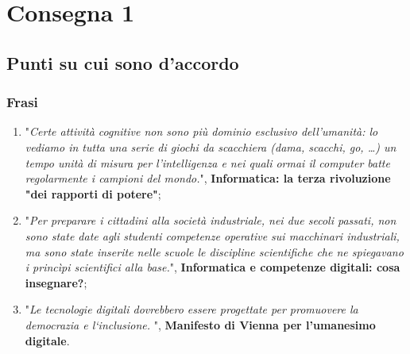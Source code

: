 \chapter{Consegna 1}

\section{Punti su cui sono d'accordo}
\subsection{Frasi}
\begin{enumerate}
    \item "\textit{Certe attività cognitive non sono più dominio esclusivo dell’umanità: lo vediamo in tutta una serie di giochi da scacchiera (dama, scacchi, go, …) un tempo unità di misura per l’intelligenza e nei quali ormai il computer batte regolarmente i campioni del mondo.}", \textbf{Informatica: la terza rivoluzione "dei rapporti di potere"};  
    \item "\textit{Per preparare i cittadini alla società industriale, nei due secoli passati, non sono state date agli studenti competenze operative sui macchinari industriali, ma sono state inserite nelle scuole le discipline scientifiche che ne spiegavano i princìpi scientifici alla base.}", \textbf{Informatica e competenze digitali: cosa insegnare?};
    \item "\textit{Le tecnologie digitali dovrebbero essere progettate per promuovere la democrazia
e l‘inclusione. }", \textbf{Manifesto di Vienna per l'umanesimo digitale}.
\end{enumerate}

